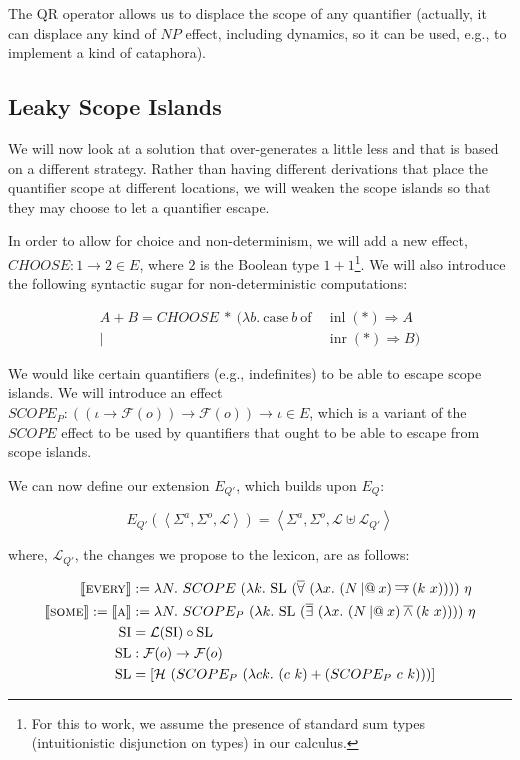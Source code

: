 \documentclass{article}
\makeatletter
\newcommand{\apl}{\mathbin{|@}}
\newcommand{\abs}[1]{\textsc{#1}}
\newcommand{\sem}[1]{\llbracket #1 \rrbracket}
\newcommand{\lex}[2]{\sem{\abs{#1}} &:= #2}
\newcommand{\dand}{\mathbin{\overline{\land}}}
\newcommand{\dimpl}{\mathbin{\overline{\to}}}
\newcommand{\dexists}{\mathop{\overline{\exists}}}
\newcommand{\dforall}{\mathop{\overline{\forall}}}
\makeatother
\begin{document}
The QR operator allows us to displace the scope of any quantifier
(actually, it can displace any kind of $NP$ effect, including dynamics, so
it can be used, e.g., to implement a kind of cataphora).

\subsection{Leaky Scope Islands}

We will now look at a solution that over-generates a little less and that
is based on a different strategy. Rather than having different derivations
that place the quantifier scope at different locations, we will weaken the
scope islands so that they may choose to let a quantifier escape.

In order to allow for choice and non-determinism, we will add a new effect,
$CHOOSE : 1 \to 2 \in E$, where $2$ is the Boolean type $1 +
1$\footnote{For this to work, we assume the presence of standard sum types
  (intuitionistic disjunction on types) in our calculus.}. We will also
introduce the following syntactic sugar for non-deterministic computations:

\begin{align*}
A + B = CHOOSE\ *\ (\lambda b.\ \text{case}\ b\ \text{of}\ &\operatorname{inl}(*) \Rightarrow A \\
|\ &\operatorname{inr}(*) \Rightarrow B)
\end{align*}

We would like certain quantifiers (e.g., indefinites) to be able to escape
scope islands. We will introduce an effect $SCOPE_P : ((\iota \to
\mathcal{F}(o)) \to \mathcal{F}(o)) \to \iota \in E$, which is a variant of
the $SCOPE$ effect to be used by quantifiers that ought to be able to
escape from scope islands.

We can now define our extension $E_{Q'}$, which builds upon $E_Q$:

$$
E_{Q'}(\left< \Sigma^a, \Sigma^o, \mathcal{L} \right>) =
\left< \Sigma^a, \Sigma^o, \mathcal{L} \uplus \mathcal{L}_{Q'} \right>
$$

where, $\mathcal{L}_{Q'}$, the changes we propose to the lexicon, are as
follows:

\begin{align*}
  \lex{every}{\lambda N.\ SCOPE\ (\lambda k.\ \mathrm{SL}\ (\dforall\ (\lambda x.\ (N \apl x) \dimpl (k\ x))))}\ \eta \\
  \sem{\abs{some}} := \sem{\abs{a}} &:= \lambda N.\ SCOPE_P\ (\lambda k.\ \mathrm{SL}\ (\dexists\ (\lambda x.\ (N \apl x) \dand (k\ x))))\ \eta \\
  \mathrm{SI} &= \mathcal{L}(\mathrm{SI}) \circ \mathrm{SL} \\
  \mathrm{SL} &: \mathcal{F}(o) \to \mathcal{F}(o) \\
  \mathrm{SL} &= [\mathcal{H}\ (SCOPE_P\ (\lambda c k.\ (c\ k) + (SCOPE_P\ c\ k)))] 
\end{align*}
\end{document}
